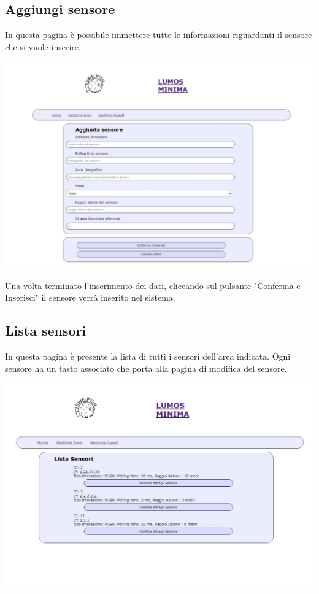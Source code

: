 \documentclass[9pt]{article}
\begin{document}
\subsection{Aggiungi sensore}
In questa pagina è possibile immettere tutte le informazioni riguardanti il sensore che si vuole inserire.

\begin{center}
	\includegraphics[scale=0.3]{Aggiungi_sensore.png}
\end{center}

Una volta terminato l'inserimento dei dati, cliccando sul pulsante "Conferma e Inserisci"
il sensore verrà inserito nel sistema.

\subsection{Lista sensori}
In questa pagina è presente la lista di tutti i sensori dell'area indicata.
Ogni sensore ha un tasto associato che porta alla pagina di modifica del sensore.

\begin{center}
	\includegraphics[scale=0.3]{Lista_sensori.png}
\end{center}
\end{document}
